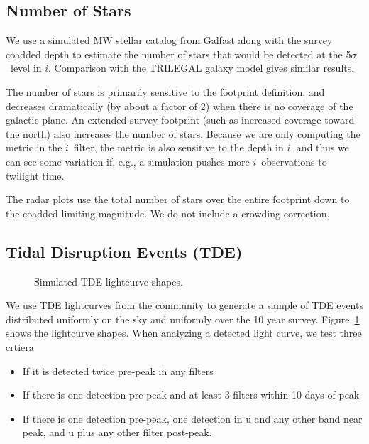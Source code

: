 \subsection{Number of Stars}

We use a simulated MW stellar catalog from Galfast \citep{2008ApJ...673..864J, 2018ascl.soft10001J} along with the survey coadded depth to estimate the number of stars that would be detected at the 5$\sigma$\ level in $i$. Comparison with the TRILEGAL galaxy model \citep{2005A&A...436..895G, 2012ASSP...26..165G} gives similar results.

The number of stars is primarily sensitive to the footprint definition, and decreases dramatically (by about a factor of 2) when there is no coverage of the galactic plane. An extended survey footprint (such as increased coverage toward the north) also increases the number of stars. Because we are only computing the metric in the $i$\ filter, the metric is also sensitive to the depth in $i$, and thus we can see some variation if, e.g., a simulation pushes more $i$\ observations to twilight time.

The radar plots use the total number of stars over the entire footprint down to the coadded limiting magnitude. We do not include a crowding correction.

\subsection{Tidal Disruption Events (TDE)}

\begin{figure}
\caption{Simulated TDE lightcurve shapes.}\label{fig:tdelc}
\end{figure}

We use TDE lightcurves from the community to generate a sample of TDE events distributed uniformly on the sky and uniformly over the 10 year survey.  Figure~\ref{fig:tdelc} shows the lightcurve shapes. When analyzing a detected light curve, we test three crtiera
\begin{itemize}
    \item{If it is detected twice pre-peak in any filters}
    \item{If there is one detection pre-peak and at least 3 filters within 10 days of peak}
    \item{If there is one detection pre-peak, one detection in u and any other band near peak, and u plus any other filter post-peak.}
\end{itemize}

